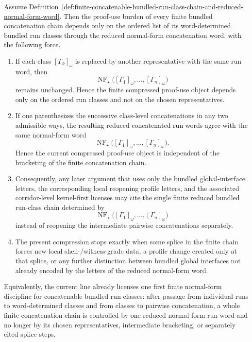\begin{proposition}
\label{prop:first-finite-run-class-normal-form-principle}
Assume Definition~\ref{def:finite-concatenable-bundled-run-class-chain-and-reduced-normal-form-word}. Then the proof-use burden of every finite bundled concatenation chain depends only on the ordered list of its word-determined bundled run classes through the reduced normal-form concatenation word, with the following force.
\begin{enumerate}[leftmargin=2em,label=(\roman*)]
\item If each class $[\Gamma_k]_{\omega}$ is replaced by another representative with the same run word, then
\[
\operatorname{NF}_{\star}\bigl([\Gamma_1]_{\omega},\dots,[\Gamma_n]_{\omega}\bigr)
\]
remains unchanged. Hence the finite compressed proof-use object depends only on the ordered run classes and not on the chosen representatives.
\item If one parenthesizes the successive class-level concatenations in any two admissible ways, the resulting reduced concatenated run words agree with the same normal-form word
\[
\operatorname{NF}_{\star}\bigl([\Gamma_1]_{\omega},\dots,[\Gamma_n]_{\omega}\bigr).
\]
Hence the current compressed proof-use object is independent of the bracketing of the finite concatenation chain.
\item Consequently, any later argument that uses only the bundled global-interface letters, the corresponding local reopening profile letters, and the associated corridor-level kernel-first licenses may cite the single finite reduced bundled run-class chain determined by
\[
\operatorname{NF}_{\star}\bigl([\Gamma_1]_{\omega},\dots,[\Gamma_n]_{\omega}\bigr)
\]
instead of reopening the intermediate pairwise concatenations separately.
\item The present compression stops exactly when some splice in the finite chain forces new local shell-/witness-grade data, a profile change created only at that splice, or any further distinction between bundled global interfaces not already encoded by the letters of the reduced normal-form word.
\end{enumerate}
Equivalently, the current line already licenses one first finite normal-form discipline for concatenable bundled run classes: after passage from individual runs to word-determined classes and from classes to pairwise concatenation, a whole finite concatenation chain is controlled by one reduced normal-form run word and no longer by its chosen representatives, intermediate bracketing, or separately cited splice steps.
\end{proposition}

